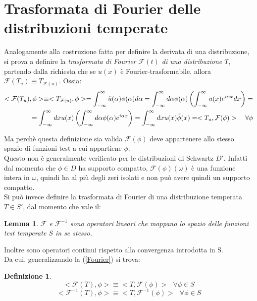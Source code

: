 \documentclass[twoside]{article}
\newtheorem{definition}{Definizione}[section]
\newtheorem{lemma}[theorem]{Lemma}
\begin{document}
\newpage
\section{Trasformata di Fourier delle distribuzioni temperate}

Analogamente alla costruzione fatta per definire la derivata di una distribuzione, si prova a definire la \textit{trasformata di Fourier $\mathcal{F}(t)$ di una distribuzione $T$}, partendo dalla richiesta che se $u(x)$ è Fourier-trasformabile, allora $\mathcal{F}(T_u)\equiv T_{\mathcal{F}(u)}$. Ossia:
\begin{equation}\label{Fourier}
    \begin{split}
        <\mathcal{F}(T_u),\phi>\equiv <T_{\mathcal{F}(u)},\phi>=\int_{-\infty}^{\infty} \Tilde{u}(\alpha)\phi(\alpha)d\alpha=\int_{-\infty}^{\infty}d\alpha \phi(\alpha)\left( \int_{-\infty} ^{\infty} u(x)e^{i\alpha x} dx \right)= \\
        = \int_{-\infty}^{\infty}dx u(x)\left( \int_{-\infty}^{\infty} d\alpha \phi(\alpha)e^{i\alpha x} \right)=\int_{-\infty}^{\infty}dx u(x) \Tilde{\phi}(x)=<T_u, \mathcal{F}(\phi)> \ \ \ \forall \phi
    \end{split}
\end{equation}

Ma perchè questa definizione sia valida $\mathcal{F}(\phi)$ deve appartenere allo stesso spazio di funzioni test a cui appartiene $\phi$.
\\
Questo non è generalmente verificato per le distribuzioni di Schwartz $D'$. Infatti dal momento che $\phi \in D$ ha supporto compatto, $\mathcal{F}(\phi)(\omega)$ è una funzione intera in $\omega$, quindi ha al più degli zeri isolati e non può avere quindi un supporto compatto.
\\
Si può invece definire la trasformata di Fourier di una distribuzione temperata $T\in S'$, dal momento che vale il:
\begin{lemma}
$\mathcal{F}$ e $\mathcal{F}^{-1}$ sono operatori lineari che mappano lo spazio delle funzioni test temperate $S$ in se stesso.
\end{lemma}
Inoltre sono operatori continui rispetto alla convergenza introdotta in S.\\
Da cui, generalizzando la (\ref{Fourier}) si trova:
\begin{definition}
    \begin{equation}
        <\mathcal{F}(T),\phi>\equiv <T,\mathcal{F}(\phi)> \ \ \ \forall \phi \in S
    \end{equation}
    \begin{equation}
        <\mathcal{F}^{-1}(T),\phi>\equiv <T,\mathcal{F}^{-1}(\phi)> \ \ \ \forall \phi \in S
    \end{equation}

\end{definition}
\end{document}

